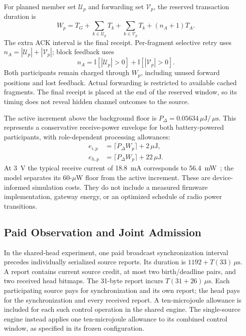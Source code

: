 \documentclass[journal,10pt]{IEEEtran}
\newcommand{\ind}{\mathbb{I}}
\newcommand{\uj}{\,\mu\mathrm{J}}
\newcommand{\us}{\,\mu\mathrm{s}}
\begin{document}
For planned member set $\mathcal U_p$ and forwarding set $\mathcal V_p$, the reserved transaction duration is
\begin{equation}
W_p=T_G+\sum_{k\in\mathcal U_p}T_k+
\sum_{k\in\mathcal V_p}T_k+(n_A+1)T_A.
\label{eq:window}
\end{equation}
The extra ACK interval is the final receipt. Per-fragment selective retry uses $n_A=|\mathcal U_p|+|\mathcal V_p|$; block feedback uses
\begin{equation}
n_A=\ind[|\mathcal U_p|>0]+\ind[|\mathcal V_p|>0].
\end{equation}
Both participants remain charged through $W_p$, including unused forward positions and lost feedback. Actual forwarding is restricted to available cached fragments. The final receipt is placed at the end of the reserved window, so its timing does not reveal hidden channel outcomes to the source.

The active increment above the background floor is $P_\Delta=0.05634\uj/\us$. This represents a conservative receive-power envelope for both battery-powered participants, with role-dependent processing allowances:
\begin{align}
e_{i,p}&=\lceil P_\Delta W_p\rceil+2\uj,\\
e_{h,p}&=\lceil P_\Delta W_p\rceil+22\uj.
\label{eq:cost}
\end{align}
At 3~V the typical receive current of 18.8~mA corresponds to 56.4~mW~\cite{cc2420}; the model separates its 60-$\mu$W floor from the active increment. These are device-informed simulation costs. They do not include a measured firmware implementation, gateway energy, or an optimized schedule of radio power transitions.

\subsection{Paid Observation and Joint Admission}
In the shared-head experiment, one paid broadcast synchronization interval precedes individually serialized source reports. Its duration is $1192+T(33)\us$. A report contains current source credit, at most two birth/deadline pairs, and two received head bitmaps. The 31-byte report incurs $T(31+26)\us$. Each participating source pays for synchronization and its own report; the head pays for the synchronization and every received report. A ten-microjoule allowance is included for each such control operation in the shared engine. The single-source engine instead applies one ten-microjoule allowance to its combined control window, as specified in its frozen configuration.
\end{document}

